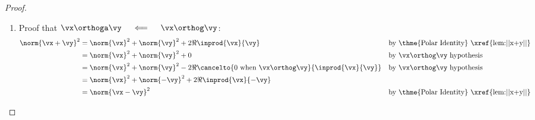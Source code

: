 \begin{proof}
\begin{enumerate}
  \item Proof that $\vx\orthoga\vy \quad\impliedby\quad \vx\orthog\vy$:
    \begin{align*}
      \norm{\vx + \vy}^2
        &= \norm{\vx}^2 + \norm{\vy}^2 + 2\Re\inprod{\vx}{\vy}
        && \text{by \thme{Polar Identity} \xref{lem:||x+y||}}
      \\&= \norm{\vx}^2 + \norm{\vy}^2 + 0
        && \text{by $\vx\orthog\vy$ hypothesis}
      \\&= \norm{\vx}^2 + \norm{\vy}^2 - 2\Re\cancelto{0 \text{ when } \vx\orthog\vy}{\inprod{\vx}{\vy}}
        && \text{by $\vx\orthog\vy$ hypothesis}
      \\&= \norm{\vx}^2 + \norm{-\vy}^2 + 2\Re\inprod{\vx}{-\vy}
        && %
      \\&= \norm{\vx-\vy}^2
        && \text{by \thme{Polar Identity} \xref{lem:||x+y||}}
  \end{align*}
\end{enumerate}
\end{proof}

